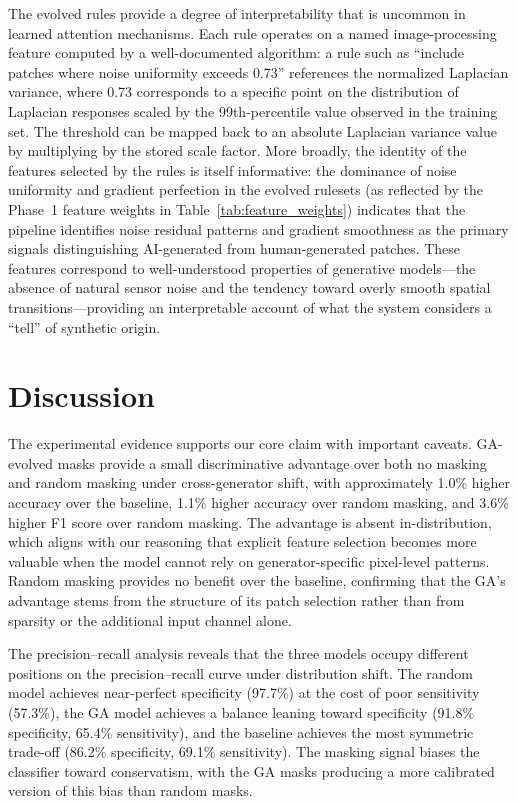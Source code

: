 \documentclass[runningheads]{llncs}
\begin{document}
The evolved rules provide a degree of interpretability that is uncommon in learned attention mechanisms. Each rule operates on a named image-processing feature computed by a well-documented algorithm: a rule such as ``include patches where noise uniformity exceeds 0.73'' references the normalized Laplacian variance, where 0.73 corresponds to a specific point on the distribution of Laplacian responses scaled by the 99th-percentile value observed in the training set. The threshold can be mapped back to an absolute Laplacian variance value by multiplying by the stored scale factor. More broadly, the identity of the features selected by the rules is itself informative: the dominance of noise uniformity and gradient perfection in the evolved rulesets (as reflected by the Phase~1 feature weights in Table~\ref{tab:feature_weights}) indicates that the pipeline identifies noise residual patterns and gradient smoothness as the primary signals distinguishing AI-generated from human-generated patches. These features correspond to well-understood properties of generative models---the absence of natural sensor noise and the tendency toward overly smooth spatial transitions---providing an interpretable account of what the system considers a ``tell'' of synthetic origin.

\section{Discussion}

The experimental evidence supports our core claim with important caveats. GA-evolved masks provide a small discriminative advantage over both no masking and random masking under cross-generator shift, with approximately 1.0\% higher accuracy over the baseline, 1.1\% higher accuracy over random masking, and 3.6\% higher F1 score over random masking. The advantage is absent in-distribution, which aligns with our reasoning that explicit feature selection becomes more valuable when the model cannot rely on generator-specific pixel-level patterns. Random masking provides no benefit over the baseline, confirming that the GA's advantage stems from the structure of its patch selection rather than from sparsity or the additional input channel alone.

The precision--recall analysis reveals that the three models occupy different positions on the precision--recall curve under distribution shift. The random model achieves near-perfect specificity (97.7\%) at the cost of poor sensitivity (57.3\%), the GA model achieves a balance leaning toward specificity (91.8\% specificity, 65.4\% sensitivity), and the baseline achieves the most symmetric trade-off (86.2\% specificity, 69.1\% sensitivity). The masking signal biases the classifier toward conservatism, with the GA masks producing a more calibrated version of this bias than random masks.
\end{document}
